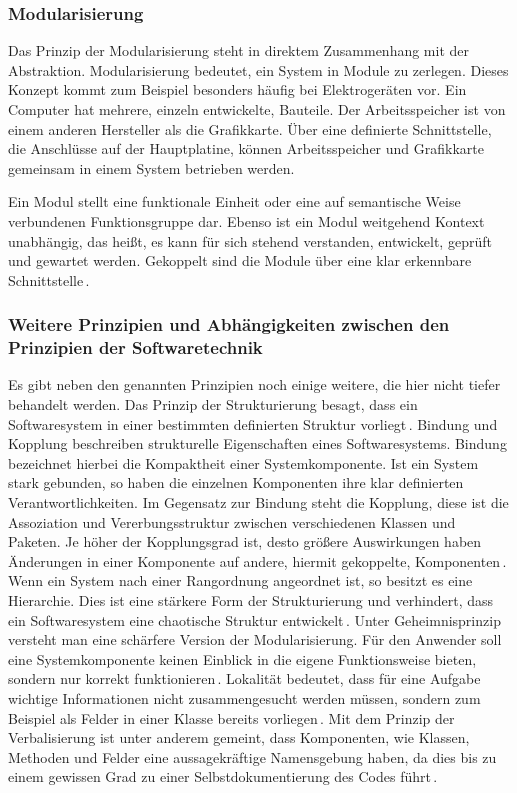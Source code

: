 \documentclass[12pt,oneside,a4paper,parskip]{scrbook}
\begin{document}
\subsubsection{Modularisierung}

Das Prinzip der Modularisierung steht in direktem Zusammenhang mit der Abstraktion. Modularisierung bedeutet, ein System in Module zu zerlegen. Dieses Konzept kommt zum Beispiel besonders häufig bei Elektrogeräten vor. Ein Computer hat mehrere, einzeln entwickelte, Bauteile. Der Arbeitsspeicher ist von einem anderen Hersteller als die Grafikkarte. Über eine definierte Schnittstelle, die Anschlüsse auf der Hauptplatine, können Arbeitsspeicher und Grafikkarte gemeinsam in einem System betrieben werden.

Ein Modul stellt eine funktionale Einheit oder eine auf semantische Weise verbundenen Funktionsgruppe dar. Ebenso ist ein Modul weitgehend Kontext unabhängig, das heißt, es kann für sich stehend verstanden, entwickelt, geprüft und gewartet werden. Gekoppelt sind die Module über eine klar erkennbare Schnittstelle\,\cite[S. 41]{balzert2009a}.

\subsubsection{Weitere Prinzipien und Abhängigkeiten zwischen den Prinzipien der Softwaretechnik}

Es gibt neben den genannten Prinzipien noch einige weitere, die hier nicht tiefer behandelt werden. Das Prinzip der Strukturierung besagt, dass ein Softwaresystem in einer bestimmten definierten Struktur vorliegt\,\cite[S. 34ff.]{balzert2009a}. Bindung und Kopplung beschreiben strukturelle Eigenschaften eines Softwaresystems. Bindung bezeichnet hierbei die Kompaktheit einer Systemkomponente. Ist ein System stark gebunden, so haben die einzelnen Komponenten ihre klar definierten Verantwortlichkeiten. Im Gegensatz zur Bindung steht die Kopplung, diese ist die Assoziation und Vererbungsstruktur zwischen verschiedenen Klassen und Paketen. Je höher der Kopplungsgrad ist, desto größere Auswirkungen haben Änderungen in einer Komponente auf andere, hiermit gekoppelte, Komponenten\,\cite[S. 37f.]{balzert2009a}. Wenn ein System nach einer Rangordnung angeordnet ist, so besitzt es eine Hierarchie. Dies ist eine stärkere Form der Strukturierung und verhindert, dass ein Softwaresystem eine chaotische Struktur entwickelt\,\cite[S. 39ff.]{balzert2009a}. Unter Geheimnisprinzip versteht man eine schärfere Version der Modularisierung. Für den Anwender soll eine Systemkomponente keinen Einblick in die eigene Funktionsweise bieten, sondern nur korrekt funktionieren\,\cite[S. 42ff.]{balzert2009a}. Lokalität bedeutet, dass für eine Aufgabe wichtige Informationen nicht zusammengesucht werden müssen, sondern zum Beispiel als Felder in einer Klasse bereits vorliegen\,\cite[S. 45f.]{balzert2009a}. Mit dem Prinzip der Verbalisierung ist unter anderem gemeint, dass Komponenten, wie Klassen, Methoden und Felder eine aussagekräftige Namensgebung haben, da dies bis zu einem gewissen Grad zu einer Selbstdokumentierung des Codes führt\,\cite[S. 46ff.]{balzert2009a}.
\end{document}
